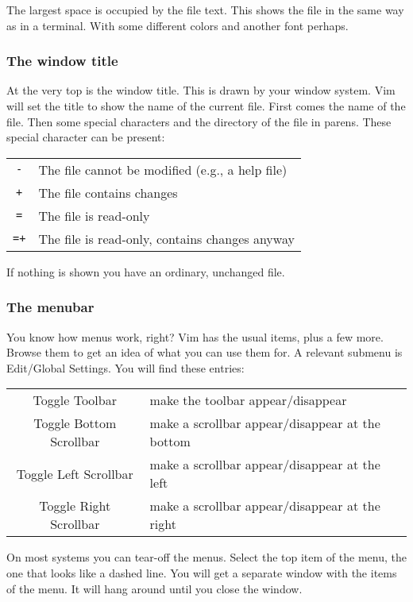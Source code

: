 The largest space is occupied by the file text.
This shows the file in the same way as in a terminal.
With some different colors and another font perhaps.
\subsubsection{The window title}
At the very top is the window title.  This is drawn by your window system.
Vim will set the title to show the name of the current file.  First comes the
name of the file.  Then some special characters and the directory of the file
in parens.  These special character can be present:

\begin{center}\begin{longtable}{c l}
				\texttt{-} & The file cannot be modified (e.g., a help file) \\
				\texttt{+} & The file contains changes \\
				\texttt{=} & The file is read-only \\
				\texttt{=+} & The file is read-only, contains changes anyway \\
\end{longtable}\end{center}
If nothing is shown you have an ordinary, unchanged file.
\subsubsection{The menubar}
You know how menus work, right?  Vim has the usual items, plus a few more.
Browse them to get an idea of what you can use them for.
A relevant submenu is Edit/Global Settings.
You will find these entries:

\begin{center}\begin{longtable}{c l}
				Toggle Toolbar & make the toolbar appear/disappear \\
				Toggle Bottom Scrollbar & make a scrollbar appear/disappear at the bottom \\
				Toggle Left Scrollbar & make a scrollbar appear/disappear at the left \\
				Toggle Right Scrollbar & make a scrollbar appear/disappear at the right \\
\end{longtable}\end{center}

On most systems you can tear-off the menus.
Select the top item of the menu, the one that looks like a dashed line.
You will get a separate window with the items of the menu.
It will hang around until you close the window.

